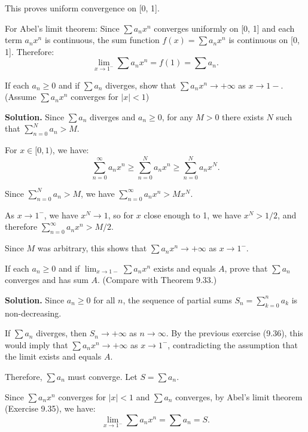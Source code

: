 This proves uniform convergence on [0, 1].

For Abel's limit theorem: Since \( \sum a_n x^n \) converges uniformly on [0, 1] and each term \( a_n x^n \) is continuous, the sum function \( f(x) = \sum a_n x^n \) is continuous on [0, 1]. Therefore:
\[\lim_{x \to 1^-} \sum a_n x^n = f(1) = \sum a_n.\]

\begin{problembox}
If each \( a_n \geq 0 \) and if \( \sum a_n \) diverges, show that \( \sum a_n x^n \to + \infty \) as \( x \to 1- \). (Assume \( \sum a_n x^n \) converges for \( |x| < 1 \))
\end{problembox}

\noindent\textbf{Solution.} Since \( \sum a_n \) diverges and \( a_n \geq 0 \), for any \( M > 0 \) there exists \( N \) such that \( \sum_{n=0}^N a_n > M \).

For \( x \in [0, 1) \), we have:
\[\sum_{n=0}^{\infty} a_n x^n \geq \sum_{n=0}^N a_n x^n \geq \sum_{n=0}^N a_n x^N.\]

Since \( \sum_{n=0}^N a_n > M \), we have \( \sum_{n=0}^{\infty} a_n x^n > M x^N \).

As \( x \to 1^- \), we have \( x^N \to 1 \), so for \( x \) close enough to 1, we have \( x^N > 1/2 \), and therefore \( \sum_{n=0}^{\infty} a_n x^n > M/2 \).

Since \( M \) was arbitrary, this shows that \( \sum a_n x^n \to +\infty \) as \( x \to 1^- \).

\begin{problembox}
If each \( a_n \geq 0 \) and if \( \lim_{x \to 1-} \sum a_n x^n \) exists and equals \( A \), prove that \( \sum a_n \) converges and has sum \( A \). (Compare with Theorem 9.33.)
\end{problembox}

\noindent\textbf{Solution.} Since \( a_n \geq 0 \) for all \( n \), the sequence of partial sums \( S_n = \sum_{k=0}^n a_k \) is non-decreasing.

If \( \sum a_n \) diverges, then \( S_n \to +\infty \) as \( n \to \infty \). By the previous exercise (9.36), this would imply that \( \sum a_n x^n \to +\infty \) as \( x \to 1^- \), contradicting the assumption that the limit exists and equals \( A \).

Therefore, \( \sum a_n \) must converge. Let \( S = \sum a_n \).

Since \( \sum a_n x^n \) converges for \( |x| < 1 \) and \( \sum a_n \) converges, by Abel's limit theorem (Exercise 9.35), we have:
\[\lim_{x \to 1^-} \sum a_n x^n = \sum a_n = S.\]

